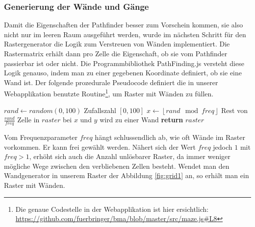 \documentclass[12pt,a4paper,german]{report}
\newcommand{\floor}[1]{\left\lfloor #1 \right\rfloor}
\begin{document}
\subsubsection{Generierung der Wände und Gänge}
Damit die Eigenschaften der Pathfinder besser zum Vorschein kommen, sie also nicht nur im leeren Raum ausgeführt werden, wurde im nächsten Schritt für den Rastergenerator die Logik zum Verstreuen von Wänden implementiert. 
Die Rastermatrix erhält dann pro Zelle die Eigenschaft, ob sie vom Pathfinder passierbar ist oder nicht. 
Die Programmbibliothek PathFinding.js versteht diese Logik genauso, indem man zu einer gegebenen Koordinate definiert, ob sie eine Wand ist. 
Der folgende prozedurale Pseudocode definiert die in unserer Webapplikation benutzte Routine\footnote{Die genaue Codestelle in der Webapplikation ist hier ersichtlich: \url{https://github.com/fuerbringer/bma/blob/master/src/maze.js\#L8}}, um Raster mit Wänden zu füllen.
\begin{algorithmic}[1]
    \State $rand \gets random(0, 100)$ \Comment Zufallszahl $[0,100]$
    \State $x \gets \floor{rand \mod freq}$ \Comment Rest von $\frac{rand}{freq}$
      \State Zelle in $raster$ bei $x$ und $y$ wird zu einer Wand
    \EndIf
    \EndFor
  \EndFor
  \State \textbf{return} $raster$
  \EndProcedure
\end{algorithmic}
Vom Frequenzparameter $freq$ hängt schlussendlich ab, wie oft Wände im Raster vorkommen. Er kann frei gewählt werden. Nähert sich der Wert $freq$ jedoch $1$ mit $freq > 1$, erhöht sich auch die Anzahl unlösbarer Raster, da immer weniger mögliche Wege zwischen den verbliebenen Zellen besteht.
Wendet man den Wandgenerator in unserem Raster der Abbildung \ref{fig:grid1} an, so erhält man ein Raster mit Wänden.
\end{document}
